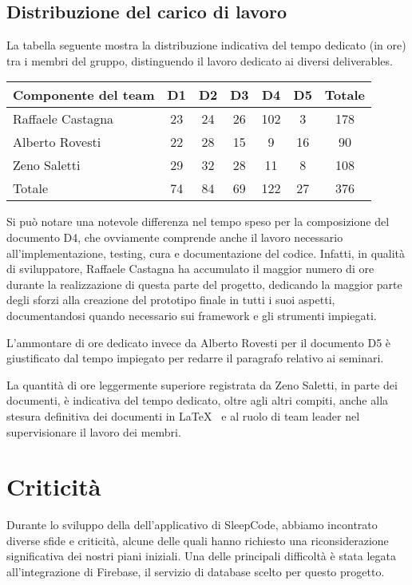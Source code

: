 \documentclass[11pt, a4paper]{article}
\theoremstyle{definition}
\begin{document}
\subsection{Distribuzione del carico di lavoro}
La tabella seguente mostra la distribuzione indicativa del tempo dedicato
(in ore) tra i membri del gruppo, distinguendo il lavoro dedicato ai diversi
deliverables.
\begin{center}
  \footnotesize
  \begin{tabularx}{\textwidth}{|X||c||c||c||c||c||c|}
      \hline
      \cellcolor{red!70}Componente del team & \cellcolor{red!70}D1 & \cellcolor{red!70}D2 & \cellcolor{red!70}D3 & \cellcolor{red!70}D4 & \cellcolor{red!70}D5 & \cellcolor{red!70}Totale\\
      \hline
      Raffaele Castagna        &23&24&26&102&3&178\\
      \hline
      Alberto Rovesti          &22&28&15&9&16&90\\
      \hline
      Zeno Saletti             &29&32&28&11&8&108\\
      \hline
      \cellcolor{red!70}Totale &74&84&69&122&27&376\\
      \hline
  \end{tabularx}
\end{center}

Si può notare una notevole differenza nel tempo speso per la composizione
del documento D4, che ovviamente comprende anche il lavoro necessario all'implementazione,
testing, cura e documentazione del codice. Infatti, in qualità di sviluppatore,
Raffaele Castagna ha accumulato il maggior numero di ore durante la realizzazione
di questa parte del progetto, dedicando la maggior parte degli sforzi alla
creazione del prototipo finale in tutti i suoi aspetti, documentandosi quando
necessario sui framework e gli strumenti impiegati.

L'ammontare di ore dedicato invece da Alberto Rovesti per il documento D5 è
giustificato dal tempo impiegato per redarre il paragrafo relativo ai seminari.

La quantità di ore leggermente superiore registrata da Zeno Saletti, in parte dei
documenti, è indicativa del tempo dedicato, oltre agli altri compiti, anche alla stesura definitiva
dei documenti in \LaTeX \texttt{ } e al ruolo di team leader nel supervisionare il lavoro
dei membri.

\section{Criticità}
Durante lo sviluppo della dell’applicativo di SleepCode, abbiamo incontrato diverse sfide e criticità, alcune delle quali hanno richiesto una riconsiderazione significativa dei nostri piani iniziali. Una delle principali difficoltà è stata legata all'integrazione di Firebase, il servizio di database scelto per questo progetto.
\end{document}
